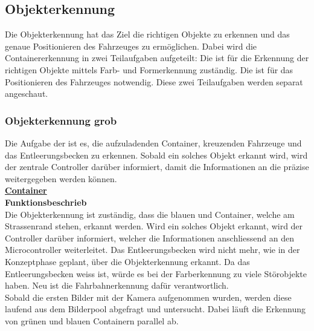 \subsection{Objekterkennung}
Die Objekterkennung hat das Ziel die richtigen Objekte zu erkennen und das genaue Positionieren des Fahrzeuges zu ermöglichen. Dabei wird die Containererkennung in zwei Teilaufgaben aufgeteilt: Die \grqq{} ist für die Erkennung der richtigen Objekte mittels Farb- und Formerkennung zuständig. Die \grqq{} ist für das Positionieren des Fahrzeuges notwendig. Diese zwei Teilaufgaben werden separat angeschaut.
%
\subsubsection{Objekterkennung grob}
Die Aufgabe der \grqq ist es, die aufzuladenden Container, kreuzenden Fahrzeuge und das Entleerungsbecken zu erkennen. Sobald ein solches Objekt erkannt wird, wird der zentrale Controller darüber informiert, damit die Informationen an die \grqq{} präzise weitergegeben werden können.
\\[0.2cm]
\underline{\textbf{Container}}
\\[0.2cm]
\textbf{Funktionsbeschrieb}\\[0.2cm]
Die Objekterkennung ist zuständig, dass die blauen und Container, welche am Strassenrand stehen, erkannt werden. Wird ein solches Objekt erkannt, wird der Controller darüber informiert, welcher die Informationen anschliessend an den Microcontroller weiterleitet. Das Entleerungsbecken wird nicht mehr, wie in der Konzeptphase geplant, über die Objekterkennung erkannt. Da das Entleerungsbecken weiss ist, würde es bei der Farberkennung zu viele Störobjekte haben. Neu ist die Fahrbahnerkennung dafür verantwortlich.
\\[0.2cm]
Sobald die ersten Bilder mit der Kamera aufgenommen wurden, werden diese laufend aus dem Bilderpool abgefragt und untersucht. Dabei läuft die Erkennung von grünen und blauen Containern parallel ab.
